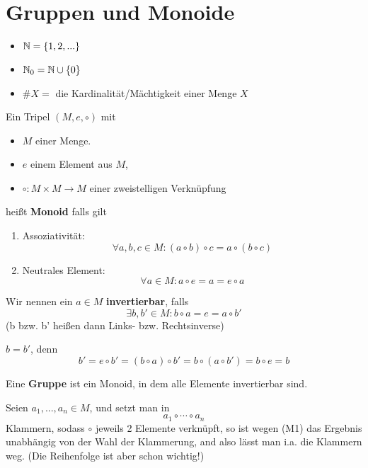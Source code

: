 \documentclass[a4paper]{report}
\begin{document}
\section{Gruppen und Monoide}%
\label{sec:Gruppen und Monoide}
\begin{nota*} \item
\begin{itemize}
  \item $\Bbb N = \{1, 2, ...\}$
  \item $\Bbb N_{0} = \Bbb N \cup \{0\}$
\item $\#X = $ die Kardinalität/Mächtigkeit einer Menge $X$
\end{itemize}
\end{nota*}

\begin{defi} %
  Ein Tripel $(M, e, \circ)$ mit
  \begin{itemize}
 \item $M$ einer Menge.
 \item $e$ einem Element aus $M$,
 \item $\circ : M \times M \to M$ einer zweistelligen Verknüpfung
  \end{itemize}
  heißt \textbf{Monoid} falls gilt
  \begin{enumerate}[(M1)]
 \item Assoziativität: $$\forall a, b, c \in M : (a \circ b) \circ c = a \circ (b \circ c)$$
 \item Neutrales Element: $$\forall a \in M : a \circ e = a = e \circ a$$
  \end{enumerate}
  Wir nennen ein $a \in M$ \textbf{invertierbar}, falls $$\exists b, b' \in M : b \circ a = e = a \circ b'$$ (b bzw. b' heißen dann Links- bzw. Rechtsinverse)
 \begin{bem*}
$b = b'$, denn $$b' = e \circ b' = (b\circ a) \circ b' = b \circ (a \circ b') = b \circ e = b$$
 \end{bem*}
\end{defi}
\begin{defi}%
Eine \textbf{Gruppe} ist ein Monoid, in dem alle Elemente invertierbar sind.
\end{defi}
\begin{bem}%
Seien $a_{1}, ..., a_{n} \in M$, und setzt man in
$$a_{1} \circ \cdots \circ a_{n}$$
Klammern, sodass $\circ$ jeweils 2 Elemente verknüpft, so ist wegen (M1) das Ergebnis unabhängig von der Wahl der Klammerung, and also lässt man i.a. die Klammern weg. (Die Reihenfolge ist aber schon wichtig!)
\end{bem}
\end{document}
